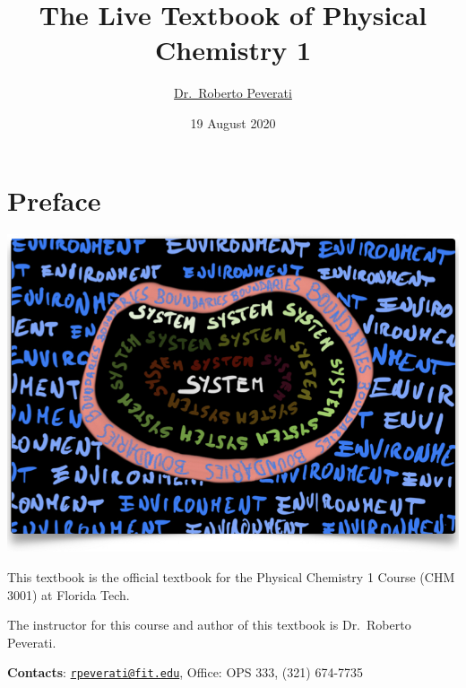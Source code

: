 \documentclass[
  9pt,
]{extbook}
\title{The Live Textbook of Physical Chemistry 1}
\author{\href{mailto:rpeverati@fit.edu}{Dr.~Roberto Peverati}}
\date{19 August 2020}
\let\oldmaketitle\maketitle
\theoremstyle{definition}
\theoremstyle{definition}
\theoremstyle{definition}
\theoremstyle{remark}
\begin{document}
\maketitle


%
\newpage

\let\maketitle\oldmaketitle

\renewcommand\thepage{\romannumeral\numexpr\value{page}-1\relax}


{
\setcounter{tocdepth}{1}
\tableofcontents
}
\renewcommand{\arraystretch}{1.8}

\hypertarget{preface}{%
\chapter*{Preface}\label{preface}}

\begin{center}\includegraphics[width=0.8\linewidth]{./img/OEP_Figures.000} \end{center}

This textbook is the official textbook for the Physical Chemistry 1 Course (CHM 3001) at Florida Tech.

The instructor for this course and author of this textbook is Dr.~Roberto Peverati.

\textbf{Contacts}: \href{mailto:rpeverati@fit.edu}{\nolinkurl{rpeverati@fit.edu}}, Office: OPS 333, (321) 674-7735
\end{document}
